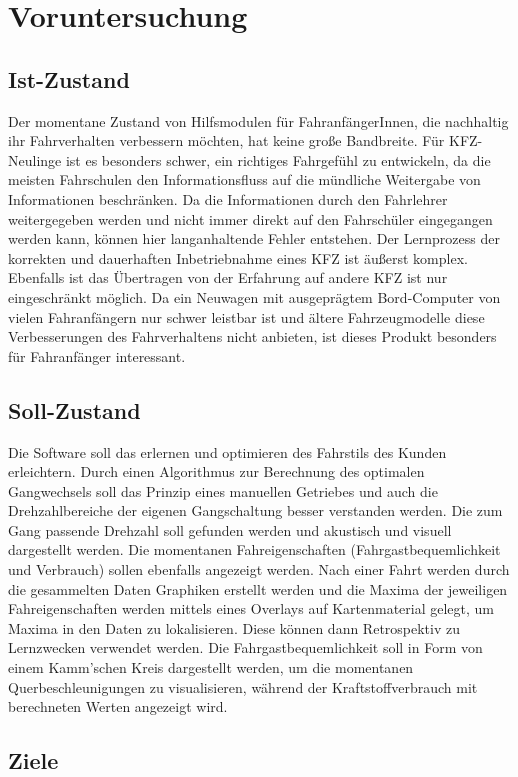 \chapter{Voruntersuchung}
\section{Ist-Zustand}
Der momentane Zustand von Hilfsmodulen für FahranfängerInnen, die nachhaltig ihr Fahrverhalten verbessern möchten, hat keine große Bandbreite. Für KFZ-Neulinge ist es besonders schwer, ein richtiges Fahrgefühl zu entwickeln, da die meisten Fahrschulen den Informationsfluss auf die mündliche Weitergabe von Informationen beschränken. Da die Informationen durch den Fahrlehrer weitergegeben werden und nicht immer direkt auf den Fahrschüler eingegangen werden kann, können hier langanhaltende Fehler entstehen. Der Lernprozess der korrekten und dauerhaften Inbetriebnahme eines KFZ ist äußerst komplex. Ebenfalls ist das Übertragen von der Erfahrung auf andere KFZ ist nur eingeschränkt möglich.
Da ein Neuwagen mit ausgeprägtem Bord-Computer von vielen Fahranfängern nur schwer leistbar ist und ältere Fahrzeugmodelle diese Verbesserungen des Fahrverhaltens nicht anbieten, ist dieses Produkt besonders für Fahranfänger interessant.
\section{Soll-Zustand}
Die Software soll das erlernen und optimieren des Fahrstils des Kunden erleichtern. Durch einen Algorithmus zur Berechnung des optimalen Gangwechsels soll das Prinzip eines manuellen Getriebes und auch die Drehzahlbereiche der eigenen Gangschaltung besser verstanden werden. Die zum Gang passende Drehzahl soll gefunden werden und akustisch und visuell dargestellt werden. Die momentanen Fahreigenschaften (Fahrgastbequemlichkeit und Verbrauch) sollen ebenfalls angezeigt werden. Nach einer Fahrt werden durch die gesammelten Daten Graphiken erstellt werden und die Maxima der jeweiligen Fahreigenschaften werden mittels eines Overlays auf Kartenmaterial gelegt, um Maxima in den Daten zu lokalisieren. Diese können dann Retrospektiv zu Lernzwecken verwendet werden. Die Fahrgastbequemlichkeit soll in Form von einem Kamm'schen Kreis dargestellt werden, um die momentanen Querbeschleunigungen zu visualisieren, während der Kraftstoffverbrauch mit berechneten Werten angezeigt wird.
\section{Ziele}
